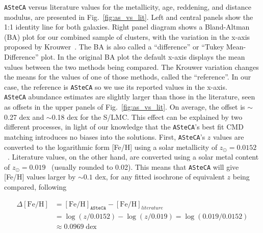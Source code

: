 \documentclass[draft]{aa}
\begin{document}
\texttt{ASteCA} versus literature values for the metallicity, age, reddening,
and distance modulus, are presented in Fig.~\ref{fig:as_vs_lit}. Left and
central panels show the 1:1 identity line for both galaxies.
%
Right panel diagram shows a Bland-Altman (BA) plot for our combined sample
of clusters, with the variation in the x-axis proposed by
Krouwer~\citep{Bland_1986,Krouwer_2008}. The BA is also called a
``difference'' or ``Tukey Mean-Difference'' plot. In the original BA plot the
default x-axis displays the mean values between the two methods being compared.
The Krouwer variation changes the means for the values of one of those methods,
called the ``reference''. In our case, the reference is \texttt{ASteCA}
so we use its reported values in the x-axis.\\
%

\texttt{ASteCA} abundance estimates are slightly larger than those in
the literature, seen as offsets in the upper panels of Fig.~\ref{fig:as_vs_lit}.
On average, the offset is $\sim$0.27 dex and $\sim$0.18 dex for the S/LMC.\@
%
This effect can be explained by two different processes, in light of our
knowledge that the \texttt{ASteCA}'s best fit CMD matching introduces no
biases into the solutions.
%
First, \texttt{ASteCA}'s $z$ values are converted to the logarithmic
form [Fe/H] using a solar metallicity of
$z_{\odot}{=}0.0152$~\citep{Bressan_2012}.
Literature values, on the other hand, are converted using a solar
metal content of $z_{\odot}{=}0.019$~\citep{Marigo_2008} (usually
rounded to 0.02). This means that \texttt{ASteCA} will give [Fe/H] values
larger by ${\sim}0.1$ dex, for any fitted isochrone of equivalent $z$ being
compared, following

\begin{equation}
\begin{split}
\Delta\mathrm{[Fe/H]} & = \mathrm{[Fe/H]}_{\mathtt{ASteCA}} -
\mathrm{[Fe/H]}_{literature} \\
& = \log(z/0.0152) - \log(z/0.019) = \log(0.019/0.0152) \\
& \approx 0.0969 \;\mathrm{dex}
\end{split}
\label{eq:delta_feh}
\end{equation}
\end{document}
